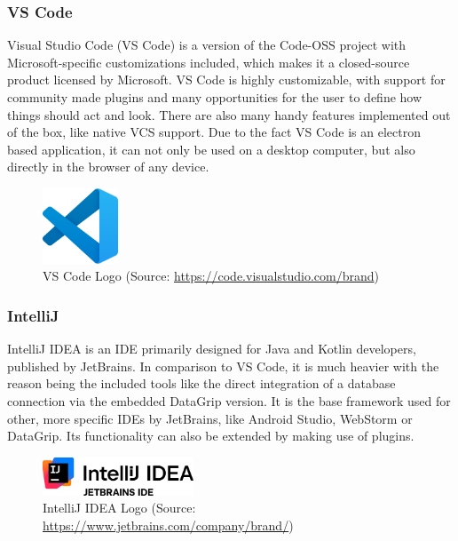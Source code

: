 \Author{\daAuthorTwo}

\subsubsection{VS Code}
Visual Studio Code (VS Code) is a version of the Code-OSS project with Microsoft-specific customizations included, which makes it a closed-source product licensed by Microsoft. VS Code is highly customizable, with support for community made plugins and many opportunities for the user to define how things should act and look. \autocite{VSCode:readMe} There are also many handy features implemented out of the box, like native VCS support. Due to the fact VS Code is an electron based application, it can not only be used on a desktop computer, but also directly in the browser of any device. \autocite{VSCode:electron} \autocite{VSCode:web}

\begin{figure} [H]
    \center
    \includegraphics [width=0.2\textwidth] {images/Technologies/vscodeLogo.png}
    \caption{VS Code Logo (Source: \url{https://code.visualstudio.com/brand})}
\end{figure}

\subsubsection{IntelliJ}
IntelliJ IDEA is an IDE primarily designed for Java and Kotlin developers, published by JetBrains. In comparison to VS Code, it is much heavier with the reason being the included tools like the direct integration of a database connection via the embedded DataGrip version. It is the base framework used for other, more specific IDEs by JetBrains, like Android Studio, WebStorm or DataGrip. Its functionality can also be extended by making use of plugins. \autocite{IntelliJ:JetBrains} \autocite{IntelliJ:Wikipedia}

\begin{figure} [H]
    \center
    \includegraphics [width=0.4\textwidth] {images/Technologies/intellijLogo.png}
    \caption{IntelliJ IDEA Logo (Source: \url{https://www.jetbrains.com/company/brand/})}
\end{figure}

